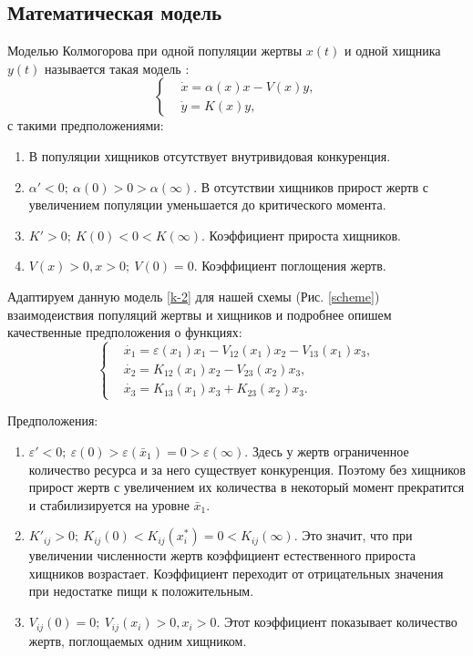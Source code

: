\subsection{Математическая модель}
    Моделью Колмогорова при одной популяции жертвы \(x (t)\) и одной хищника \(y (t)\) называется такая модель \cite{svilog}:
    \begin{equation}
        \left\{\begin{split}
            & \dot{x} = \alpha(x)x - V(x) y, \\
            & \dot{y} = K(x) y,
        \end{split}\right. \label{k-2}
    \end{equation}
    с такими предположениями:
    
    \begin{enumerate}
        \item В популяции хищников отсутствует внутривидовая конкуренция.
        \item \( \alpha' < 0; ~ \alpha(0) > 0 > \alpha(\infty) \). В отсутствии хищников прирост жертв с увеличением популяции уменьшается до критического момента.
        \item \( K' > 0; ~ K(0) < 0 < K(\infty) \). Коэффициент прироста хищников.
        \item \( V(x) > 0, x > 0; ~ V(0) = 0 \). Коэффициент поглощения жертв.
    \end{enumerate}

    Адаптируем данную модель \eqref{k-2} для нашей схемы (Рис. \ref{scheme}) взаимодеиствия популяций жертвы и хищников и подробнее опишем качественные предположения о функциях:
    \begin{equation}
        \left\{\begin{split}
            & \dot{x_1} = \varepsilon(x_1)x_1 - V_{12}(x_1)x_2 - V_{13}(x_1)x_3, \\
            & \dot{x_2} = K_{12}(x_1)x_2 - V_{23}(x_2)x_3, \\
            & \dot{x_3} = K_{13}(x_1)x_3 + K_{23}(x_2)x_3. 
        \end{split}\right. \label{k-3g}
    \end{equation}

    Предположения:
    \begin{enumerate}
        \item \( \varepsilon' < 0; ~ \varepsilon(0) > \varepsilon(\bar{x}_1) = 0 > \varepsilon(\infty)\). Здесь у жертв ограниченное количество ресурса и за него существует конкуренция. Поэтому без хищников прирост жертв с увеличением их количества в некоторый момент прекратится и стабилизируется на уровне \( \bar{x}_1 \).
        \item \( K'_{ij} > 0; ~ K_{ij}(0) < K_{ij}(x_i^*) = 0 < K_{ij} (\infty) \). Это значит, что при увеличении численности жертв коэффициент естественного прироста хищников возрастает. Коэффициент переходит от отрицательных значения при недостатке пищи к положительным.
        \item \( V_{ij}(0) = 0; ~ V_{ij} (x_i) > 0, x_i > 0 \). Этот коэффициент показывает количество жертв, поглощаемых одним хищником.
    \end{enumerate}

